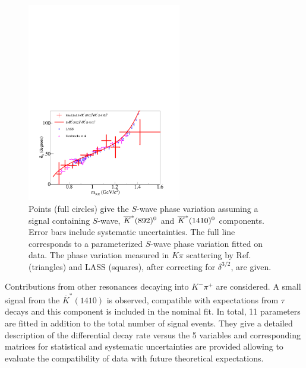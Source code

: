 \begin{figure}[!htb]
	\centering
\includegraphics[bb=0 0 567 384, width=0.6\textwidth]{figures/charm/sl_babar_swave_hfag2012.pdf}
\caption{Points (full circles) give the \babar $S$-wave phase variation 
assuming a signal containing $S$-wave, $\overline{K}^*(892)^0$ and $\overline{K}^*(1410)^0$ components. 
Error bars include systematic uncertainties.
The full line corresponds to a parameterized $S$-wave phase variation 
fitted on \babar data.
The phase variation measured in $K\pi$ scattering
by Ref. \cite{Estabrooks:1977xe} (triangles) and LASS \cite{Aston:1987ir} (squares), 
after correcting 
for $\delta^{3/2}$, are given.}
\label{fig:swave_phase}
\end{figure}

Contributions from other resonances decaying into $K^-\pi^+$ are considered.
A small signal from the $\overline{K}^*(1410)$ is observed, compatible
with expectations from $\tau$ decays and this component is included in the
nominal fit. In total, 11 parameters are fitted in addition to the total
number of signal events. They give a detailed description of the differential
decay rate versus the 5 variables and corresponding matrices for 
statistical and systematic uncertainties are provided allowing to 
evaluate the compatibility of data with future theoretical expectations.

